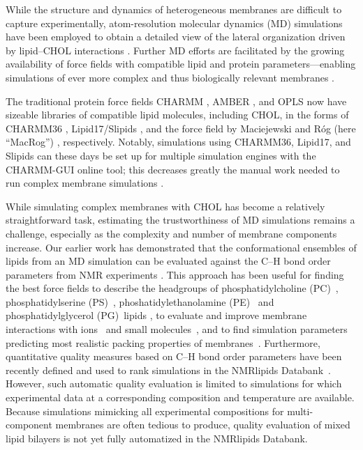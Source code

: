 \documentclass[journal=jctcce]{achemso}
\begin{document}
While the structure and dynamics of heterogeneous membranes are difficult to capture experimentally, atom-resolution molecular dynamics (MD) simulations have been employed to obtain a detailed view of the lateral organization driven by lipid--CHOL interactions \cite{rog14,rog2009ordering,berkowitz2009detailed,enkavi2019multiscale,marrink2019computational}. Further MD efforts are facilitated by the growing availability of force fields with compatible lipid and protein parameters---enabling simulations of ever more complex and thus biologically relevant membranes \cite{lorent2020plasma}. 

The traditional protein force fields CHARMM \cite{brooks1983charmm}, AMBER \cite{cornell1995second}, and OPLS \cite{jorgensen1988opls,harder2016opls3} now have sizeable libraries of compatible lipid molecules, including CHOL, in the forms of CHARMM36 \cite{Klauda06,lim12}, Lipid17/Slipids \cite{dickson14,madej15,jambeck12,jambeck12b,jambeck13b,grote2020optimization}, and the force field by Maciejewski and R\'og (here ``MacRog'') \cite{maciejewski14,kulig14,kulig15,Kulig16}, respectively. Notably, simulations using CHARMM36, Lipid17, and Slipids can these days be set up for multiple simulation engines with the CHARMM-GUI online tool; this decreases greatly the manual work needed to run complex membrane simulations \cite{lee16,lee2020charmm}. 

While simulating complex membranes with CHOL has become a relatively straightforward task, estimating the trustworthiness of MD simulations remains a challenge, especially as the complexity and number of membrane components increase. Our earlier work has demonstrated that the conformational ensembles of lipids from an MD simulation can be evaluated against the C--H bond order parameters from NMR experiments \cite{botan15,ollila16,catte2016molecular,antila2019headgroup,bacle2021inverse}. This approach has been useful for finding the best force fields to describe the headgroups of phosphatidylcholine (PC)~\cite{botan15,kurki2022structure}, phosphatidylserine (PS)~\cite{antila2019headgroup}, phoshatidylethanolamine (PE)~\cite{bacle2021inverse} and phosphatidylglycerol (PG)~lipids \cite{bacle2021inverse}, to evaluate and improve membrane interactions with ions~\cite{catte2016molecular,antila2019headgroup,bacle2021inverse,melcr18,melcr19} and small molecules~\cite{nencini22}, and to find simulation parameters predicting most realistic packing properties of membranes~\cite{antila2022emerging,NMRlipidsDatabank}. Furthermore, quantitative quality measures based on C--H bond order parameters have been recently defined and used to rank simulations in the NMRlipids Databank~\cite{NMRlipidsDatabank}. However, such automatic quality evaluation is limited to simulations for which experimental data at a corresponding composition and temperature are available. Because simulations mimicking all experimental compositions for multi-component membranes are often tedious to produce, quality evaluation of mixed lipid bilayers is not yet fully automatized in the NMRlipids Databank. 
\end{document}
